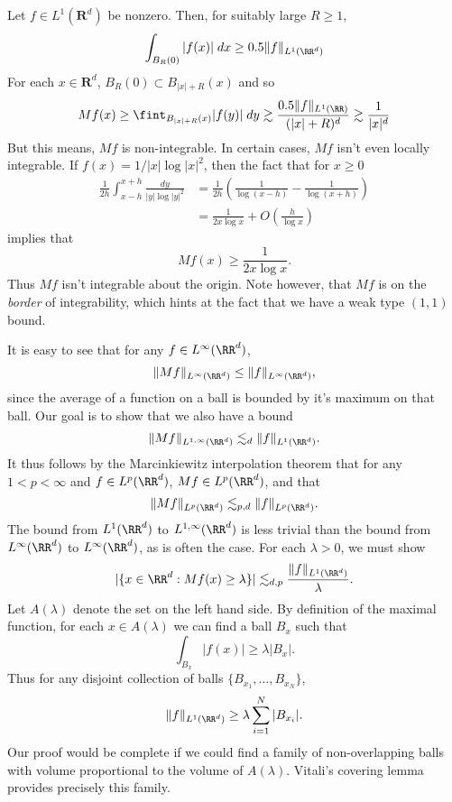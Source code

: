 \begin{example}
  Let $f \in L^1(\mathbf{R}^d)$ be nonzero. Then, for suitably large $R \geq 1$,
  \[ \int_{B_R(0)} |f(x)|\; dx \geq 0.5 \| f \|_{L^1(\RR^d)} \]
  For each $x \in \mathbf{R}^d$, $B_R(0) \subset B_{|x|+R}(x)$ and so
  \[ Mf(x) \geq \fint_{B_{|x|+R}(x)} |f(y)|\; dy \gtrsim \frac{0.5 \| f \|_{L^1(\RR)}}{(|x| + R)^d} \gtrsim \frac{1}{|x|^d} \]
  But this means, $Mf$ is non-integrable. In certain cases, $Mf$ isn't even locally integrable. If $f(x) = 1/|x| \log|x|^2$, then the fact that for $x \geq 0$
  \begin{align*}
    \frac{1}{2h} \int_{x-h}^{x+h} \frac{dy}{|y| \log |y|^2} &= \frac{1}{2h} \left( \frac{1}{\log(x-h)} - \frac{1}{\log(x+h)} \right)\\
    &= \frac{1}{2x \log x} + O \left( \frac{h}{\log x} \right)
  \end{align*}
  implies that
  \[ Mf(x) \geq \frac{1}{2x \log x}. \]
  Thus $Mf$ isn't integrable about the origin. Note however, that $Mf$ is on the \emph{border} of integrability, which hints at the fact that we have a weak type $(1,1)$ bound.
\end{example}

It is easy to see that for any $f \in L^\infty(\RR^d)$,
%
\[ \| Mf \|_{L^\infty(\RR^d)} \leq \| f \|_{L^\infty(\RR^d)}, \]
%
since the average of a function on a ball is bounded by it's maximum on that ball. Our goal is to show that we also have a bound
%
\[ \| Mf \|_{L^{1,\infty}(\RR^d)} \lesssim_d \| f \|_{L^1(\RR^d)}. \]
%
It thus follows by the Marcinkiewitz interpolation theorem that for any $1 < p < \infty$ and $f \in L^p(\RR^d)$, $Mf \in L^p(\RR^d)$, and that
%
\[ \| Mf \|_{L^p(\RR^d)} \lesssim_{p,d} \| f \|_{L^p(\RR^d)}. \]
%
The bound from $L^1(\RR^d)$ to $L^{1,\infty}(\RR^d)$ is less trivial than the bound from $L^\infty(\RR^d)$ to $L^\infty(\RR^d)$, as is often the case. For each $\lambda > 0$, we must show
%
\[ |\{ x \in \RR^d : Mf(x) \geq \lambda \}| \lesssim_{d,p} \frac{\| f \|_{L^1(\RR^d)}}{\lambda}. \]
%
Let $A(\lambda)$ denote the set on the left hand side. By definition of the maximal function, for each $x \in A(\lambda)$ we can find a ball $B_x$ such that
%
\[ \int_{B_x} |f(x)| \geq \lambda |B_x|. \]
%
Thus for any disjoint collection of balls $\{ B_{x_1}, \dots, B_{x_N} \}$,
%
\[ \| f \|_{L^1(\RR^d)} \geq \lambda \sum_{i = 1}^N |B_{x_i}|. \]
%
Our proof would be complete if we could find a family of non-overlapping balls with volume proportional to the volume of $A(\lambda)$. Vitali's covering lemma provides precisely this family.

